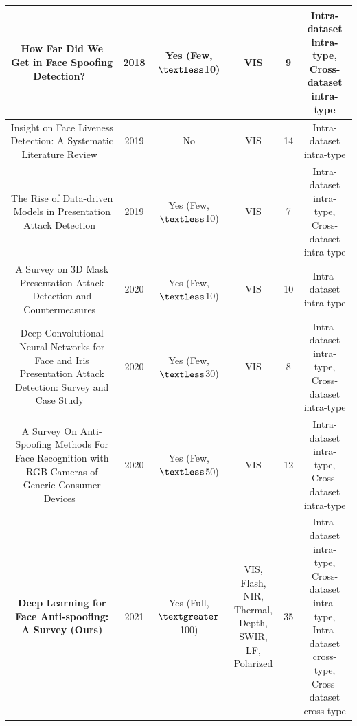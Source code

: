 \documentclass[10pt,journal,compsoc]{IEEEtran}
\begin{document}
\begin{table}[t]
{\begin{tabular}{c c c c c c}
  \midrule
 How Far Did We Get in Face Spoofing Detection?~\cite{souza2018far} & 2018 & \tabincell{c}{Yes\\(Few, $\textless$10)} & VIS  & 9 & \tabincell{c}{Intra-dataset intra-type,\\Cross-dataset intra-type}\\

  \midrule
 Insight on Face Liveness Detection: A Systematic Literature Review~\cite{raheem2019insight} & 2019 & No & VIS  & 14 & Intra-dataset intra-type\\

  \midrule
 The Rise of Data-driven Models in Presentation Attack Detection~\cite{pereira2020rise} & 2019 & \tabincell{c}{Yes\\(Few, $\textless$10)} & VIS  & 7 & \tabincell{c}{Intra-dataset intra-type,\\Cross-dataset intra-type}\\ 

  \midrule
 A Survey on 3D Mask Presentation Attack Detection and Countermeasures~\cite{jia2020survey} & 2020 & \tabincell{c}{Yes\\(Few, $\textless$10)} & VIS  & 10 & Intra-dataset intra-type\\

  \midrule
 \tabincell{c}{Deep Convolutional Neural Networks for Face and Iris Presentation Attack \\Detection: Survey and Case Study}~\cite{el2020deep} & 2020 & \tabincell{c}{Yes\\(Few, $\textless$30)} & VIS  & 8 & \tabincell{c}{Intra-dataset intra-type,\\Cross-dataset intra-type}\\ 


 \midrule
 \tabincell{c}{A Survey On Anti-Spoofing Methods For Face Recognition with\\ RGB Cameras of Generic Consumer Devices}~\cite{ming2020survey} & 2020 & \tabincell{c}{Yes\\(Few, $\textless$50)} & VIS  & 12 & \tabincell{c}{Intra-dataset intra-type,\\Cross-dataset intra-type}\\ 


  \midrule
 \textbf{Deep Learning for Face Anti-spoofing: A Survey (Ours)} & 2021 & \tabincell{c}{Yes\\(Full, $\textgreater$100)} & \tabincell{c}{VIS, Flash,\\NIR, Thermal, \\Depth, SWIR, \\LF, Polarized}  & 35 & \tabincell{c}{Intra-dataset intra-type,\\Cross-dataset intra-type,\\Intra-dataset cross-type,\\Cross-dataset cross-type}\\ 

 \bottomrule[1pt]
 \end{tabular}}
\end{table}
\end{document}
